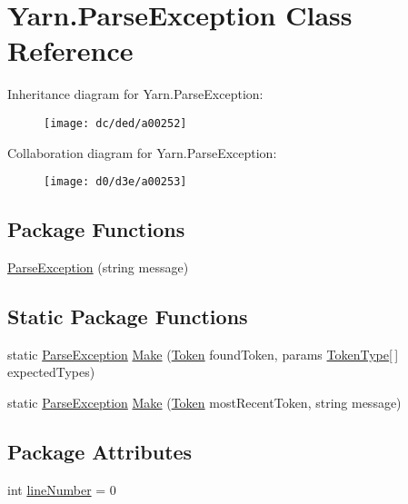 \hypertarget{a00062}{\section{Yarn.\-Parse\-Exception Class Reference}
\label{a00062}
}


Inheritance diagram for Yarn.\-Parse\-Exception\-:
\nopagebreak
\begin{figure}[H]
\begin{center}
\leavevmode
\texttt{[image: dc/ded/a00252]}
\end{center}
\end{figure}


Collaboration diagram for Yarn.\-Parse\-Exception\-:
\nopagebreak
\begin{figure}[H]
\begin{center}
\leavevmode
\texttt{[image: d0/d3e/a00253]}
\end{center}
\end{figure}
\subsection*{Package Functions}
\begin{DoxyCompactItemize}
\item 
\hyperlink{a00062_aa3c4f5c8b0ae86097bbc46044df9f317}{Parse\-Exception} (string message)
\end{DoxyCompactItemize}
\subsection*{Static Package Functions}
\begin{DoxyCompactItemize}
\item 
static \hyperlink{a00062}{Parse\-Exception} \hyperlink{a00062_a511a51bb42dc5bb107eb68f7e5cf5ff1}{Make} (\hyperlink{a00079}{Token} found\-Token, params \hyperlink{a00026_a301aa7c866593a5b625a8fc158bbeace}{Token\-Type}\mbox{[}$\,$\mbox{]} expected\-Types)
\item 
static \hyperlink{a00062}{Parse\-Exception} \hyperlink{a00062_a173f3cabc4741d9d9e016310e90c1c9f}{Make} (\hyperlink{a00079}{Token} most\-Recent\-Token, string message)
\end{DoxyCompactItemize}
\subsection*{Package Attributes}
\begin{DoxyCompactItemize}
\item 
int \hyperlink{a00062_ab335169367e64fd6d89d58b3ac573751}{line\-Number} = 0
\end{DoxyCompactItemize}


